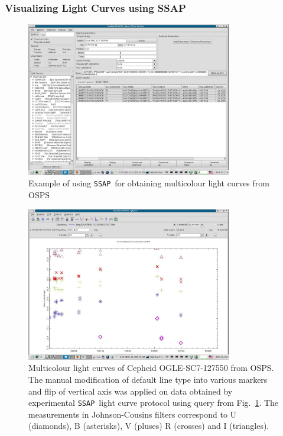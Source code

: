 \documentclass[final,authoryear,5p,times,twocolumn]{elsarticle}
\newcommand{\ssap}{\texttt{SSAP}}
\begin{document}
\subsubsection{Visualizing Light Curves using  SSAP}

\begin{figure}[t]
\begin{center}
\includegraphics[width=0.8\textwidth]{OGLE-SC7-127550_query.pdf}
\caption{Example of using \ssap\ for obtaining multicolour light curves from OSPS}
\label{fig:OGLE-SC7-127550_query}
\end{center}
\end{figure}

\begin{figure}[t]
\begin{center}
\includegraphics[width=0.8\textwidth]{OGLE-SC7-127550_plot.pdf}
\caption{Multicolour light curves of Cepheid OGLE-SC7-127550 from
  OSPS. The manual modification of default line type into various
  markers and flip of vertical axis was applied on data obtained by
  experimental \ssap\ light curve protocol using query from
  Fig.~\ref{fig:OGLE-SC7-127550_query}. The measurements in
  Johnson-Cousins filters correspond to U (diamonds), B (asterisks),
  V (pluses) R (crosses) and I (triangles).  }
\label{fig:OGLE-SC7-127550_plot}
\end{center}
\end{figure}
\end{document}
